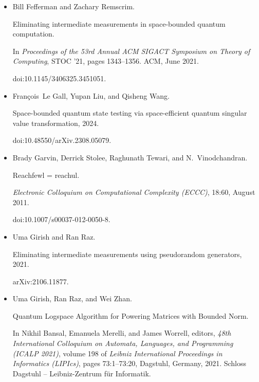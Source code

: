 \begin{itemize}
doi:10.4230/LIPIcs.ITCS.2018.4.





\item[] 
[10]

Bill Fefferman and Zachary Remscrim.


Eliminating intermediate measurements in space-bounded quantum
computation.


In \emph{Proceedings of the 53rd Annual ACM SIGACT Symposium on Theory
of Computing}, STOC ’21, pages 1343–1356. ACM, June 2021.


doi:10.1145/3406325.3451051.





\item[] 
[11]

François Le Gall, Yupan Liu, and Qisheng Wang.


Space-bounded quantum state testing via space-efficient quantum
singular value transformation, 2024.


doi:10.48550/arXiv.2308.05079.





\item[] 
[12]

Brady Garvin, Derrick Stolee, Raghunath Tewari, and N. Vinodchandran.


Reachfewl = reachul.


\emph{Electronic Colloquium on Computational Complexity (ECCC)},
18:60, August 2011.


doi:10.1007/s00037-012-0050-8.





\item[] 
[13]

Uma Girish and Ran Raz.


Eliminating intermediate measurements using pseudorandom generators,
2021.


arXiv:2106.11877.





\item[] 
[14]

Uma Girish, Ran Raz, and Wei Zhan.


Quantum Logspace Algorithm for Powering Matrices with Bounded Norm.


In Nikhil Bansal, Emanuela Merelli, and James Worrell, editors, \emph{48th International Colloquium on Automata, Languages, and Programming (ICALP
2021)}, volume 198 of \emph{Leibniz International Proceedings in Informatics
(LIPIcs)}, pages 73:1–73:20, Dagstuhl, Germany, 2021. Schloss Dagstuhl –
Leibniz-Zentrum für Informatik.



\end{itemize}
